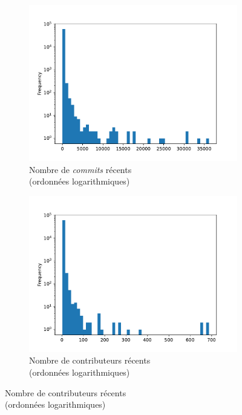 \documentclass[dvipsnames,runningheads]{llncs}
\begin{document}
    \begin{figure}[ht]
        \begin{subfigure}[t]{0.3\textwidth}
            \includegraphics[width=\textwidth]{../experiment/data_analysis/recentCommitCount_distribution}
            \caption{Nombre de \emph{commits} récents\\(ordonnées logarithmiques)}
        \end{subfigure}
        \begin{subfigure}[t]{0.3\textwidth}
            \includegraphics[width=\textwidth]{../experiment/data_analysis/recentContributorCount_distribution}
            \caption{Nombre de contributeurs récents\\(ordonnées logarithmiques)}

\end{subfigure}
\end{figure}
\end{document}
